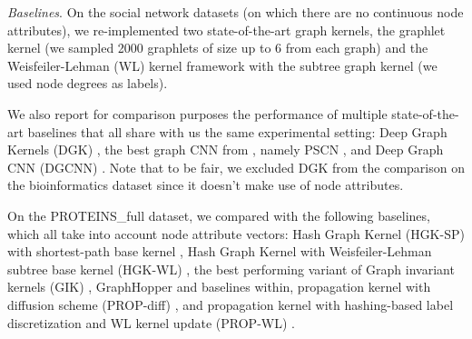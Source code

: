 \documentclass[runningheads]{llncs}
\begin{document}
\vspace{-0.25cm}

\begin{table}[h]
\begin{center}
\end{center}
\captionsetup{justification=centering, size=small}
\caption{Final resolution, number of channels, and , and  \texttt{node2vec} parameters for each dataset. number of channels for node embeddings and continuous node attributes. - means default value(s).}
\label{table:best}
\end{table}

\vspace{-0.8cm}

\textit{Baselines}.
On the social network datasets (on which there are no continuous node attributes), we re-implemented two state-of-the-art graph kernels, the graphlet kernel \cite{shervashidze2009efficient} (we sampled 2000 graphlets of size up to 6 from each graph) and the Weisfeiler-Lehman (WL) kernel framework \cite{shervashidze2011weisfeiler} with the subtree graph kernel \cite{gartner2003graph} (we used node degrees as labels).

We also report for comparison purposes the performance of multiple state-of-the-art baselines that all share with us the same experimental setting: Deep Graph Kernels (DGK) \cite{yanardag2015deep}, the best graph CNN from \cite{niepert2016learning}, namely PSCN , and Deep Graph CNN (DGCNN) \cite{zhang2018end}. Note that to be fair, we excluded DGK from the comparison on the bioinformatics dataset since it doesn't make use of node attributes.

On the PROTEINS\_full dataset, we compared with the following baselines, which all take into account node attribute vectors:
Hash Graph Kernel (HGK-SP) with shortest-path base kernel \cite{morris2016faster},
Hash Graph Kernel with Weisfeiler-Lehman subtree base kernel (HGK-WL) \cite{morris2016faster},
the best performing variant of Graph invariant kernels (GIK) \cite{orsini2015graph},
GraphHopper \cite{feragen2013scalable} and baselines within,
propagation kernel with diffusion scheme (PROP-diff) \cite{neumann2012efficient}, and 
propagation kernel with hashing-based label discretization and WL kernel update (PROP-WL) \cite{neumann2012efficient}.
\end{document}
